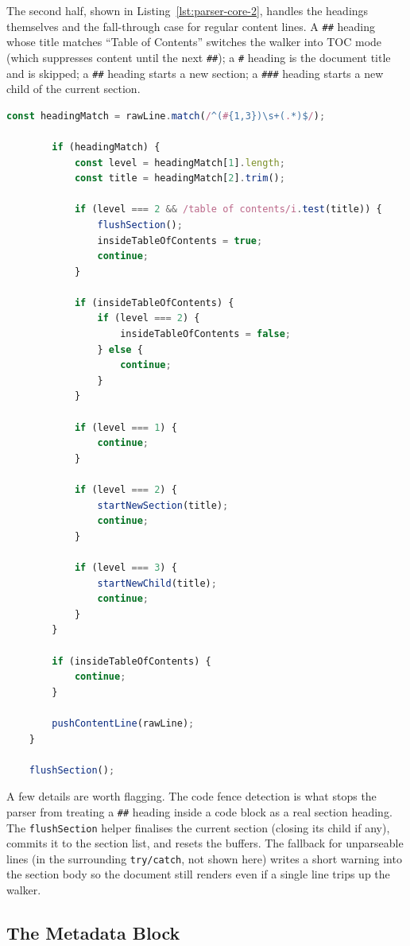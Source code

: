 	The second half, shown in Listing~\ref{lst:parser-core-2}, handles the headings themselves and the fall-through case for regular content lines. A \texttt{\#\#} heading whose title matches ``Table of Contents'' switches the walker into TOC mode (which suppresses content until the next \texttt{\#\#}); a \texttt{\#} heading is the document title and is skipped; a \texttt{\#\#} heading starts a new section; a \texttt{\#\#\#} heading starts a new child of the current section.
	
	\begin{lstlisting}[language=TypeScript,caption={The second half of \texttt{parseRepositoryDocument}: heading handling and fall-through to content lines.},label={lst:parser-core-2}]
		const headingMatch = rawLine.match(/^(#{1,3})\s+(.*)$/);
		
		if (headingMatch) {
			const level = headingMatch[1].length;
			const title = headingMatch[2].trim();
			
			if (level === 2 && /table of contents/i.test(title)) {
				flushSection();
				insideTableOfContents = true;
				continue;
			}
			
			if (insideTableOfContents) {
				if (level === 2) {
					insideTableOfContents = false;
				} else {
					continue;
				}
			}
			
			if (level === 1) {
				continue;
			}
			
			if (level === 2) {
				startNewSection(title);
				continue;
			}
			
			if (level === 3) {
				startNewChild(title);
				continue;
			}
		}
		
		if (insideTableOfContents) {
			continue;
		}
		
		pushContentLine(rawLine);
	}
	
	flushSection();
\end{lstlisting}

A few details are worth flagging. The code fence detection is what stops the parser from treating a \texttt{\#\#} heading inside a code block as a real section heading. The \texttt{flushSection} helper finalises the current section (closing its child if any), commits it to the section list, and resets the buffers. The fallback for unparseable lines (in the surrounding \texttt{try/catch}, not shown here) writes a short warning into the section body so the document still renders even if a single line trips up the walker.

\subsection{The Metadata Block}\label{subsec:dev-parser-metadata}

